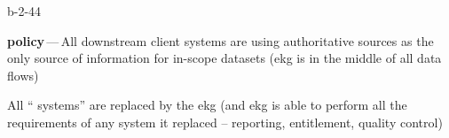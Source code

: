 \begin{level-assessment}{b-2-4}{4}

    \item \textbf{policy}\,---\,All downstream client systems are using authoritative sources as the only source of information
          for in-scope datasets (\gls{ekg} is in the middle of all data flows)
    \item All “ systems” are replaced by the \gls{ekg}
          (and \gls{ekg} is able to perform all the requirements of any system it replaced --
          reporting, entitlement, quality control)

\end{level-assessment}
